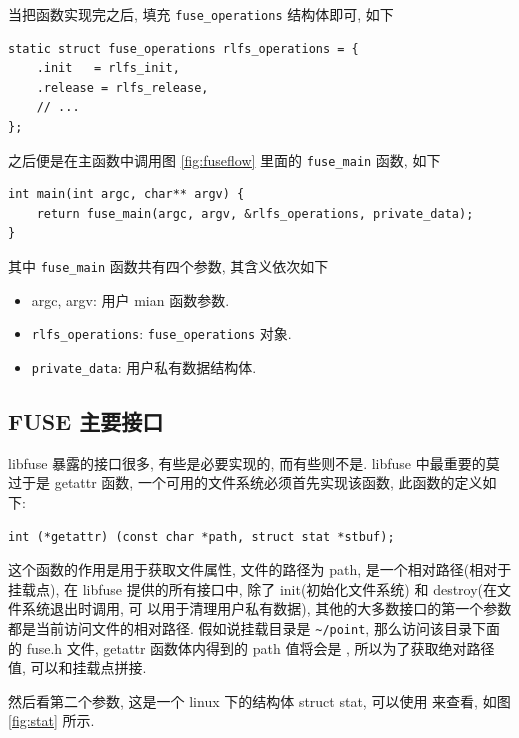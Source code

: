当把函数实现完之后, 填充 \verb|fuse_operations| 结构体即可, 如下

\begin{lstlisting}[style=verb]
static struct fuse_operations rlfs_operations = {
    .init	= rlfs_init,
    .release = rlfs_release,
    // ...
};
\end{lstlisting}

之后便是在主函数中调用图 \ref{fig:fuseflow} 里面的 \verb|fuse_main| 函数, 如下
\begin{lstlisting}[style=verb]
int main(int argc, char** argv) {
	return fuse_main(argc, argv, &rlfs_operations, private_data);
}
\end{lstlisting}

其中 \verb|fuse_main| 函数共有四个参数, 其含义依次如下

\begin{itemize}
    \item argc, argv: 用户 mian 函数参数.
    \item \verb|rlfs_operations|: \verb|fuse_operations| 对象.
    \item \verb|private_data|: 用户私有数据结构体.
\end{itemize}

\subsection{FUSE 主要接口}

libfuse 暴露的接口很多, 有些是必要实现的, 而有些则不是. libfuse 中最重要的莫过于是
getattr 函数, 一个可用的文件系统必须首先实现该函数, 此函数的定义如下:

\begin{lstlisting}[style=verb]
int (*getattr) (const char *path, struct stat *stbuf);
\end{lstlisting}

这个函数的作用是用于获取文件属性, 文件的路径为 path, 是一个相对路径(相对于挂载点),
在 libfuse 提供的所有接口中, 除了 init(初始化文件系统) 和 destroy(在文件系统退出时调用, 可
以用于清理用户私有数据), 其他的大多数接口的第一个参数都是当前访问文件的相对路径.
假如说挂载目录是 \verb|~/point|, 那么访问该目录下面的 fuse.h 文件,
getattr 函数体内得到的 path 值将会是 , 所以为了获取绝对路径值,
可以和挂载点拼接.

然后看第二个参数, 这是一个 linux 下的结构体 struct stat, 可以使用  来查看,
如图 \ref{fig:stat} 所示.

